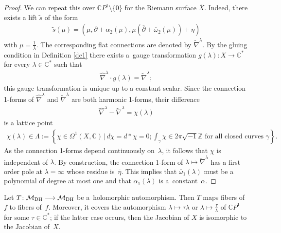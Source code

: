\begin{proof}
We can repeat this over $\mathbb CP^1\setminus\{0\}$ for the Riemann surface $\overline X$. Indeed, there exists a lift $\widetilde s$ of the form
\begin{gather*}\widetilde{s}(\mu) = (\mu,\partial +\alpha_2(\mu), \mu(\overline{\partial}+ \overline{\omega}_2(\mu))+\overline{\eta})\end{gather*}
with $\mu = \frac{1}{\lambda}$. The corresponding f\/lat connections are denoted by $\widetilde{\nabla}^\lambda$. By the gluing condition in Def\/inition \ref{de1} there exists a~gauge transformation $g(\lambda) \colon X \longrightarrow \mathbb C^*$ for every $\lambda \in \mathbb C^*$ such that \begin{gather*}\widehat{\nabla}^\lambda\cdot g(\lambda) = \widetilde{\nabla}^\lambda ;\end{gather*}
this gauge transformation is unique up to a constant scalar. Since the connection 1-forms of $\widehat{\nabla}^\lambda$ and $\widetilde{\nabla}^\lambda$ are both harmonic 1-forms, their dif\/ference
\begin{gather*}\widehat{\nabla}^\lambda-\widetilde{\nabla}^\lambda = \chi(\lambda)\end{gather*}
is a lattice point
\begin{gather}\label{Gamma}
\chi(\lambda) \in \Lambda := \left\{\!\chi \in \Omega^1(X, \mathbb C) \,|\, d\chi = d*\chi = 0;
\int_\gamma\chi\in2\pi\sqrt{-1}\mathbb Z \text{ for all closed curves } \gamma\!\right\}\!.\!\!\!\!\end{gather}
As the connection 1-forms depend continuously on~$\lambda$, it follows that $\chi$ is independent of $\lambda$. By construction, the connection 1-form of $\lambda \longmapsto \widetilde{\nabla}^\lambda$ has a f\/irst order pole at $\lambda = \infty$ whose residue is~$\overline{\eta}$.
This implies that $\overline{\omega}_1(\lambda)$ must be a polynomial of degree at most one and that $\alpha_1(\lambda)$ is a~constant~$\alpha$.
\end{proof}

\begin{Lemma}\label{tau-lemma} Let $T \colon {\mathcal M}_{\rm DH} \longrightarrow {\mathcal M}_{\rm DH}$ be a~holomorphic automorphism. Then $T$ maps fibers of~$f$ to fibers of~$f$. Moreover, it covers the automorphism $\lambda \longmapsto \tau\lambda$ or $\lambda \longmapsto \frac{\tau}{\lambda}$ of ${\mathbb C}P^1$ for some $\tau \in \mathbb C^*$; if the latter case occurs, then the Jacobian of $X$ is isomorphic to the Jacobian of~$\overline X$.
\end{Lemma}

